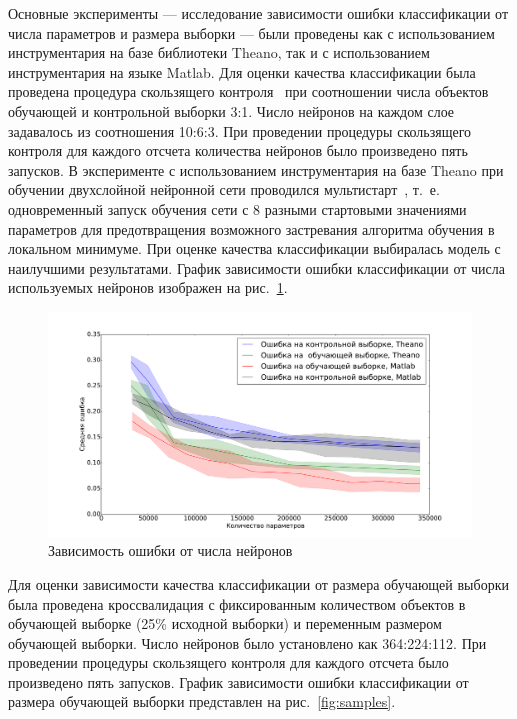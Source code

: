 \documentclass[12pt]{article}
\begin{document}
Основные эксперименты --- исследование зависимости ошибки классификации от числа параметров и размера выборки --- были проведены как с использованием инструментария на базе библиотеки Theano, так и с использованием инструментария на языке Matlab.
Для оценки качества классификации была проведена процедура скользящего контроля~\cite{cv} при соотношении числа объектов обучающей и контрольной выборки 3:1. Число нейронов на каждом слое задавалось из соотношения 10:6:3. При проведении процедуры скользящего контроля для каждого отсчета количества нейронов было произведено пять запусков. В эксперименте с использованием инструментария на базе Theano при обучении двухслойной нейронной сети проводился мультистарт~\cite{multi}, т.~е. одновременный запуск обучения сети с 8 разными стартовыми значениями параметров для предотвращения возможного застревания алгоритма обучения в локальном минимуме. При оценке качества классификации выбиралась модель с наилучшими результатами. График зависимости ошибки классификации от числа используемых нейронов изображен на рис.~\ref{fig:neurons}.


\begin{figure}[tb!]
 \centering
  \includegraphics[width=1.0\textwidth]{neurons.pdf}
 \caption{Зависимость ошибки от числа нейронов}
 \label{fig:neurons}
\end{figure}


Для оценки зависимости качества классификации от размера обучающей выборки была проведена кроссвалидация с фиксированным количеством объектов в обучающей выборке (25\% исходной выборки) и переменным размером обучающей выборки. Число нейронов было установлено как 364:224:112. При проведении процедуры скользящего контроля для каждого отсчета было произведено пять запусков. График зависимости ошибки классификации от размера обучающей выборки представлен на рис.~\ref{fig:samples}.
\end{document}
